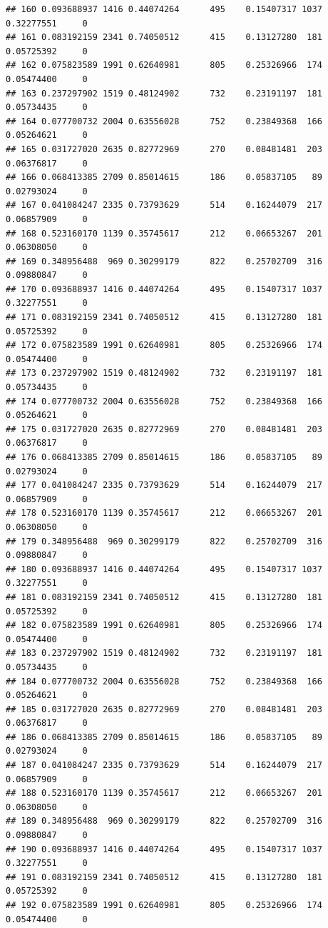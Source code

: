 \documentclass[
]{article}
\begin{document}
\begin{verbatim}
## 160 0.093688937 1416 0.44074264      495    0.15407317 1037 0.32277551     0
## 161 0.083192159 2341 0.74050512      415    0.13127280  181 0.05725392     0
## 162 0.075823589 1991 0.62640981      805    0.25326966  174 0.05474400     0
## 163 0.237297902 1519 0.48124902      732    0.23191197  181 0.05734435     0
## 164 0.077700732 2004 0.63556028      752    0.23849368  166 0.05264621     0
## 165 0.031727020 2635 0.82772969      270    0.08481481  203 0.06376817     0
## 166 0.068413385 2709 0.85014615      186    0.05837105   89 0.02793024     0
## 167 0.041084247 2335 0.73793629      514    0.16244079  217 0.06857909     0
## 168 0.523160170 1139 0.35745617      212    0.06653267  201 0.06308050     0
## 169 0.348956488  969 0.30299179      822    0.25702709  316 0.09880847     0
## 170 0.093688937 1416 0.44074264      495    0.15407317 1037 0.32277551     0
## 171 0.083192159 2341 0.74050512      415    0.13127280  181 0.05725392     0
## 172 0.075823589 1991 0.62640981      805    0.25326966  174 0.05474400     0
## 173 0.237297902 1519 0.48124902      732    0.23191197  181 0.05734435     0
## 174 0.077700732 2004 0.63556028      752    0.23849368  166 0.05264621     0
## 175 0.031727020 2635 0.82772969      270    0.08481481  203 0.06376817     0
## 176 0.068413385 2709 0.85014615      186    0.05837105   89 0.02793024     0
## 177 0.041084247 2335 0.73793629      514    0.16244079  217 0.06857909     0
## 178 0.523160170 1139 0.35745617      212    0.06653267  201 0.06308050     0
## 179 0.348956488  969 0.30299179      822    0.25702709  316 0.09880847     0
## 180 0.093688937 1416 0.44074264      495    0.15407317 1037 0.32277551     0
## 181 0.083192159 2341 0.74050512      415    0.13127280  181 0.05725392     0
## 182 0.075823589 1991 0.62640981      805    0.25326966  174 0.05474400     0
## 183 0.237297902 1519 0.48124902      732    0.23191197  181 0.05734435     0
## 184 0.077700732 2004 0.63556028      752    0.23849368  166 0.05264621     0
## 185 0.031727020 2635 0.82772969      270    0.08481481  203 0.06376817     0
## 186 0.068413385 2709 0.85014615      186    0.05837105   89 0.02793024     0
## 187 0.041084247 2335 0.73793629      514    0.16244079  217 0.06857909     0
## 188 0.523160170 1139 0.35745617      212    0.06653267  201 0.06308050     0
## 189 0.348956488  969 0.30299179      822    0.25702709  316 0.09880847     0
## 190 0.093688937 1416 0.44074264      495    0.15407317 1037 0.32277551     0
## 191 0.083192159 2341 0.74050512      415    0.13127280  181 0.05725392     0
## 192 0.075823589 1991 0.62640981      805    0.25326966  174 0.05474400     0

\end{verbatim}
\end{document}
